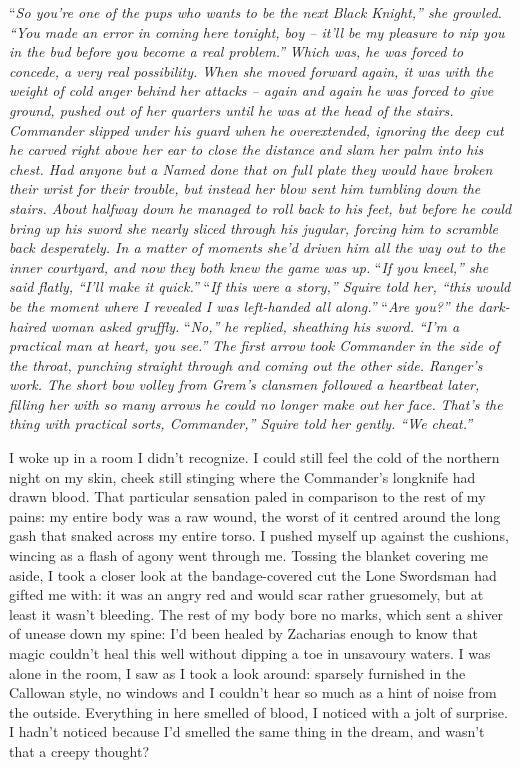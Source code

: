 \documentclass[12pt, openany]{book}
\begin{document}
“\textit{So you’re one of the pups who wants to be the next Black Knight,” she growled. “You made an error in coming here tonight, boy – it’ll be my pleasure to nip you in the bud before you become a real problem.”}
\textit{Which was, he was forced to concede, a very real possibility. When she moved forward again, it was with the weight of cold anger behind her attacks – again and again he was forced to give ground, pushed out of her quarters until he was at the head of the stairs. Commander slipped under his guard when he overextended, ignoring the deep cut he carved right above her ear to close the distance and slam her palm into his chest. Had anyone but a Named done that on full plate they would have broken their wrist for their trouble, but instead her blow sent him tumbling down the stairs. About halfway down he managed to roll back to his feet, but before he could bring up his sword she nearly sliced through his jugular, forcing him to scramble back desperately. In a matter of moments she’d driven him all the way out to the inner courtyard, and now they both knew the game was up.}
“\textit{If you kneel,” she said flatly, “I’ll make it quick.”}
“\textit{If this were a story,” Squire told her, “this would be the moment where I revealed I was left-handed all along.”}
“\textit{Are you?” the dark-haired woman asked gruffly.}
“\textit{No,” he replied, sheathing his sword. “I’m a practical man at heart, you see.”}
\textit{The first arrow took Commander in the side of the throat, punching straight through and coming out the other side. Ranger’s work. The short bow volley from Grem’s clansmen followed a heartbeat later, filling her with so many arrows he could no longer make out her face.}
\textit{That’s the thing with practical sorts, Commander,” Squire told her gently. “We cheat.”}

I woke up in a room I didn’t recognize.
I could still feel the cold of the northern night on my skin, cheek still stinging where the Commander’s longknife had drawn blood. That particular sensation paled in comparison to the rest of my pains: my entire body was a raw wound, the worst of it centred around the long gash that snaked across my entire torso. I pushed myself up against the cushions, wincing as a flash of agony went through me. Tossing the blanket covering me aside, I took a closer look at the bandage-covered cut the Lone Swordsman had gifted me with: it was an angry red and would scar rather gruesomely, but at least it wasn’t bleeding. The rest of my body bore no marks, which sent a shiver of unease down my spine: I’d been healed by Zacharias enough to know that magic couldn’t heal this well without dipping a toe in unsavoury waters. I was alone in the room, I saw as I took a look around: sparsely furnished in the Callowan style, no windows and I couldn’t hear so much as a hint of noise from the outside. Everything in here smelled of blood, I noticed with a jolt of surprise. I hadn’t noticed because I’d smelled the same thing in the dream, and wasn’t that a creepy thought?
\end{document}
